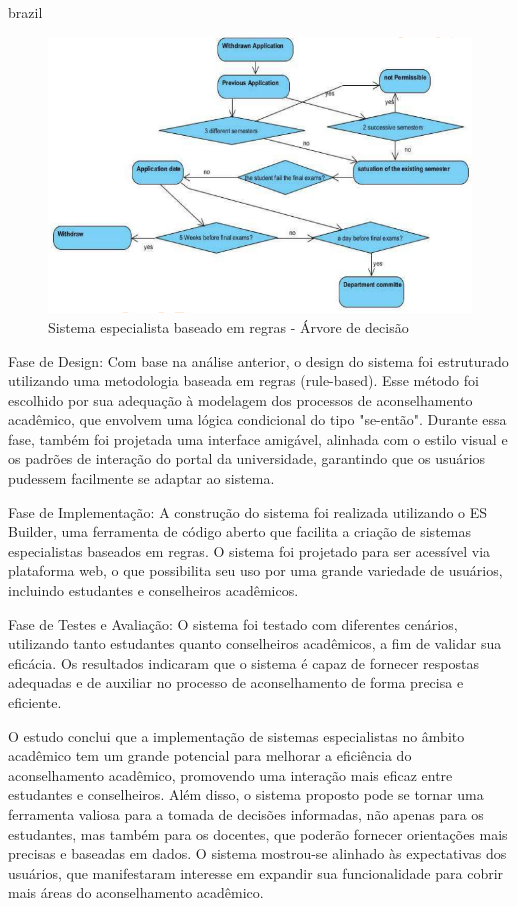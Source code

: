 \begin{otherlanguage*}{brazil}
\begin{figure}[h!]
        \centering
         \caption{Sistema especialista baseado em regras - Árvore de decisão}
         \label{fig:ModeloConceitual}
                \includegraphics[scale=0.5]{pictures/Rule_Based_Expert_System_arvore_decisao.png}
\end{figure}

Fase de Design: Com base na análise anterior, o design do sistema foi estruturado utilizando uma metodologia baseada em regras (rule-based). Esse método foi escolhido por sua adequação à modelagem dos processos de aconselhamento acadêmico, que envolvem uma lógica condicional do tipo "se-então". Durante essa fase, também foi projetada uma interface amigável, alinhada com o estilo visual e os padrões de interação do portal da universidade, garantindo que os usuários pudessem facilmente se adaptar ao sistema.

Fase de Implementação: A construção do sistema foi realizada utilizando o ES Builder, uma ferramenta de código aberto que facilita a criação de sistemas especialistas baseados em regras. O sistema foi projetado para ser acessível via plataforma web, o que possibilita seu uso por uma grande variedade de usuários, incluindo estudantes e conselheiros acadêmicos.

Fase de Testes e Avaliação: O sistema foi testado com diferentes cenários, utilizando tanto estudantes quanto conselheiros acadêmicos, a fim de validar sua eficácia. Os resultados indicaram que o sistema é capaz de fornecer respostas adequadas e de auxiliar no processo de aconselhamento de forma precisa e eficiente.

O estudo conclui que a implementação de sistemas especialistas no âmbito acadêmico tem um grande potencial para melhorar a eficiência do aconselhamento acadêmico, promovendo uma interação mais eficaz entre estudantes e conselheiros. Além disso, o sistema proposto pode se tornar uma ferramenta valiosa para a tomada de decisões informadas, não apenas para os estudantes, mas também para os docentes, que poderão fornecer orientações mais precisas e baseadas em dados. O sistema mostrou-se alinhado às expectativas dos usuários, que manifestaram interesse em expandir sua funcionalidade para cobrir mais áreas do aconselhamento acadêmico.


\end{otherlanguage*}
